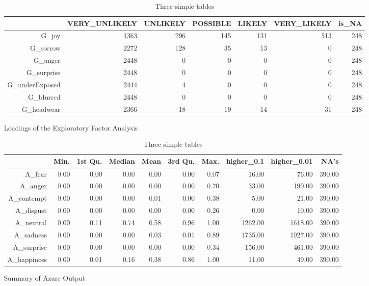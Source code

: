\begin{table}

\begin{subtable}{1\textwidth}
\centering
   \begin{tabular}{rrrrrrr}
  \hline
 & VERY\_UNLIKELY & UNLIKELY & POSSIBLE & LIKELY & VERY\_LIKELY & is\_NA \\ 
  \hline
G\_joy & 1363 & 296 & 145 & 131 & 513 & 248 \\ 
  G\_sorrow & 2272 & 128 &  35 &  13 &   0 & 248 \\ 
  G\_anger & 2448 &   0 &   0 &   0 &   0 & 248 \\ 
  G\_surprise & 2448 &   0 &   0 &   0 &   0 & 248 \\ 
  G\_underExposed & 2444 &   4 &   0 &   0 &   0 & 248 \\ 
  G\_blurred & 2448 &   0 &   0 &   0 &   0 & 248 \\ 
  G\_headwear & 2366 &  18 &  19 &  14 &  31 & 248 \\ 
   \hline
\end{tabular}
   \caption{Loadings of the Exploratory Factor Analysis} 
    \label{Tab:Load}
\end{subtable}

\bigskip
\begin{subtable}{1\textwidth}
\centering
\begin{tabular}{rrrrrrrrrr}
  \hline
 & Min.    & 1st Qu. & Median  & Mean    & 3rd Qu. & Max.    & higher\_0.1 & higher\_0.01 & NA's    \\ 
  \hline
    A\_fear & 0.00 & 0.00 & 0.00 & 0.00 & 0.00 & 0.07 & 16.00 & 76.00 & 390.00 \\ 
     A\_anger & 0.00 & 0.00 & 0.00 & 0.00 & 0.00 & 0.70 & 33.00 & 190.00 & 390.00 \\ 
    A\_contempt & 0.00 & 0.00 & 0.00 & 0.01 & 0.00 & 0.38 & 5.00 & 21.00 & 390.00 \\ 
    A\_disgust & 0.00 & 0.00 & 0.00 & 0.00 & 0.00 & 0.26 & 0.00 & 10.00 & 390.00 \\ 
    A\_neutral & 0.00 & 0.11 & 0.74 & 0.58 & 0.96 & 1.00 & 1262.00 & 1618.00 & 390.00 \\ 
    A\_sadness & 0.00 & 0.00 & 0.00 & 0.03 & 0.01 & 0.89 & 1735.00 & 1927.00 & 390.00 \\ 
    A\_surprise & 0.00 & 0.00 & 0.00 & 0.00 & 0.00 & 0.34 & 156.00 & 461.00 & 390.00 \\ 
   A\_happiness & 0.00 & 0.01 & 0.16 & 0.38 & 0.86 & 1.00 & 11.00 & 49.00 & 390.00 \\ 
   \hline
\end{tabular}
\caption{Summary of Azure Output} 
\label{Tab:Img_Azure}

\end{subtable}

\caption{Three simple tables} \label{tab:three_tables}
\end{table}
